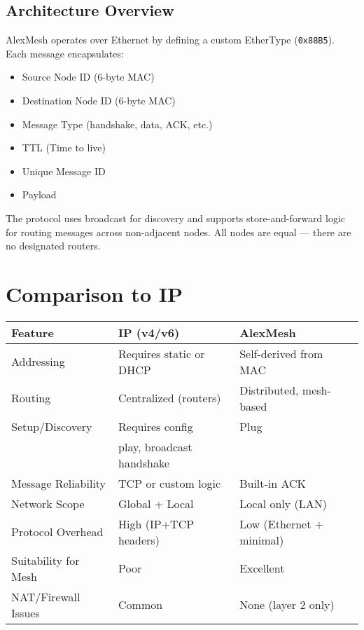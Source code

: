 \documentclass[11pt]{article}
\begin{document}
\subsection{Architecture Overview}
AlexMesh operates over Ethernet by defining a custom EtherType (\texttt{0x88B5}). Each message encapsulates:
\begin{itemize}[noitemsep]
  \item Source Node ID (6-byte MAC)
  \item Destination Node ID (6-byte MAC)
  \item Message Type (handshake, data, ACK, etc.)
  \item TTL (Time to live)
  \item Unique Message ID
  \item Payload
\end{itemize}

The protocol uses broadcast for discovery and supports store-and-forward logic for routing messages across non-adjacent nodes. All nodes are equal --- there are no designated routers.

\section{Comparison to IP}

\begin{center}
\begin{tabular}{|l|l|l|}
\hline
\textbf{Feature} & \textbf{IP (v4/v6)} & \textbf{AlexMesh} \\
\hline
Addressing & Requires static or DHCP & Self-derived from MAC \\
Routing & Centralized (routers) & Distributed, mesh-based \\
Setup/Discovery & Requires config & Plug \\& play, broadcast handshake \\
Message Reliability & TCP or custom logic & Built-in ACK \\
Network Scope & Global + Local & Local only (LAN) \\
Protocol Overhead & High (IP+TCP headers) & Low (Ethernet + minimal) \\
Suitability for Mesh & Poor & Excellent \\
NAT/Firewall Issues & Common & None (layer 2 only) \\
\hline
\end{tabular}
\end{center}
\end{document}
